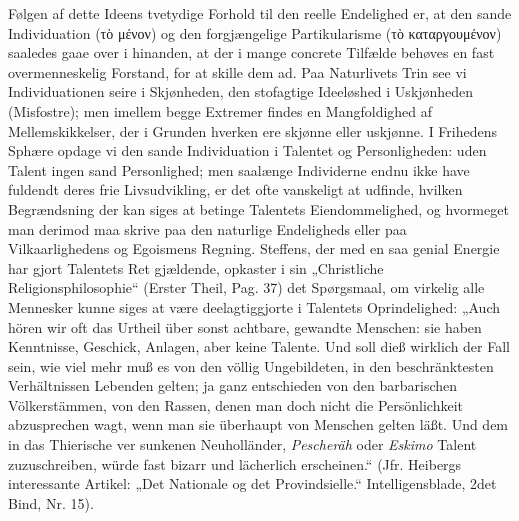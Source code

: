 \documentclass[12pt]{book}
\newcommand{\opage}[1]{\marginnote{\footnotesize\textit{[#1]}}}
\begin{document}
Følgen af dette Ideens tvetydige Forhold til den reelle Endelighed er, at den sande
Individuation (τὸ μένον) og den forgjængelige Partikularisme (τὸ καταργουμένον) saaledes
gaae over i hinanden, at der i mange concrete Tilfælde behøves en fast overmenneskelig
Forstand, for at skille dem ad. Paa Naturlivets Trin see vi Individuationen seire i
Skjønheden, den stofagtige Ideeløshed i Uskjønheden (Misfostre); men imellem begge
Extremer findes en Mangfoldighed af Mellemskikkelser, der i Grunden hverken ere skjønne
eller uskjønne. I Frihedens Sphære opdage vi den sande Individuation i Talentet og
Personligheden: uden Talent ingen sand Personlighed; men saalænge Individerne endnu ikke
have fuldendt deres frie Livsudvikling, er det ofte vanskeligt at udfinde, hvilken
Begrændsning der kan siges at betinge Talentets Eiendommelighed, og hvormeget man derimod
maa skrive paa den naturlige Endeligheds eller paa Vilkaarlighedens og Egoismens Regning.
Steffens, der med en saa genial Energie har gjort Talentets Ret gjældende, opkaster i sin
„Christliche Religionsphilosophie“ (Erster Theil, Pag. 37) det Spørgsmaal, om virkelig
alle Mennesker kunne siges at være deelagtiggjorte i Talentets Oprindelighed: „Auch hören
wir oft das Urtheil über sonst achtbare, gewandte Menschen: sie haben Kenntnisse,
Geschick, Anlagen, aber keine Talente. Und soll dieß wirklich der Fall sein, wie viel
mehr muß es von den völlig Ungebildeten, in den beschränktesten Verhältnissen Lebenden
gelten; ja ganz entschieden von den barbarischen Völkerstämmen, von den Rassen, denen man
doch nicht die Persönlichkeit abzusprechen wagt, wenn man sie überhaupt von Menschen
gelten läßt. Und dem in das Thierische ver%
\opage{261}%
sunkenen Neuholländer, \emph{Pescheräh} oder \emph{Eskimo} Talent zuzuschreiben, würde
fast bizarr und lächerlich erscheinen.“ (Jfr. Heibergs interessante Artikel: „Det
Nationale og det Provindsielle.“ Intelligensblade, 2det Bind, Nr. 15).
\end{document}
